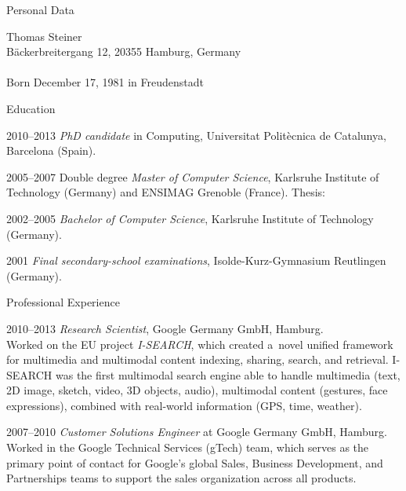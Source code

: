\begin{cv}{}
\begin{cvlist}{Personal Data}
	\item[]
		Thomas Steiner \\
		Bäckerbreitergang 12,
		20355 Hamburg,
		Germany\\ \\
		Born December 17, 1981 in Freudenstadt
\end{cvlist}
%
\begin{cvlist}{Education}
    \item[2010--2013] \emph{PhD candidate} in Computing, Universitat Politècnica de Catalunya, Barcelona (Spain).
    \item[2005--2007] Double degree \emph{Master of Computer Science},
    Karlsruhe Institute of Technology (Germany) and
    ENSIMAG Grenoble (France).  
    Thesis: 
    \\[0.4\baselineskip]
    \item[2002--2005] \emph{Bachelor of Computer Science}, Karlsruhe Institute of Technology (Germany).
	\item[2001] \emph{Final secondary-school examinations}, Isolde-Kurz-Gymnasium Reutlingen (Germany).
\end{cvlist}

\begin{cvlist}{Professional Experience}
    \item[2010--2013] \emph{Research Scientist},
    Google Germany GmbH, Hamburg.
    \\[0.4\baselineskip]
    Worked on the EU
    project \mbox{\emph{I-SEARCH}},
    which created a~novel unified framework for 
    multimedia and multimodal content indexing,
    sharing, search, and retrieval. \mbox{I-SEARCH}
    was the first multimodal search engine able to handle  
    multimedia (text, 2D image, sketch, video,
    3D objects, audio),
    multimodal content (gestures, face expressions),
    combined with real-world information
    (GPS, time, weather).
    \item[2007--2010] \emph{Customer Solutions Engineer}
    at Google Germany GmbH, Hamburg.
    \\[0.4\baselineskip]
    Worked in the Google Technical Services (gTech) team,
    which serves as the primary point of contact for
    Google's global Sales, Business Development, and
    Partnerships teams to support the sales organization
    across all products.
\end{cvlist}

\end{cv}

